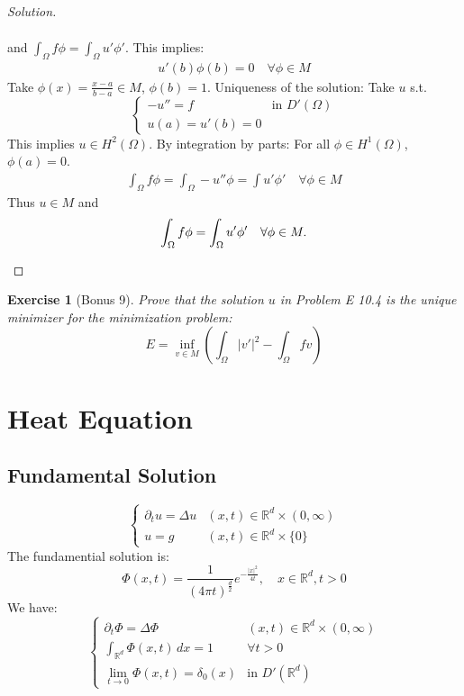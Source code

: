 \documentclass{report}
\theoremstyle{tommy}
\newtheorem{ex}[defn]{Exercise}
\begin{document}
\begin{proof}[Solution]
\begin{enumerate}[label=\alph*)]
\begin{align*}
      \end{align*}
      and \(\int_\Omega f \phi = \int_\Omega u' \phi'\). This implies:
      \begin{align*}
        u'(b) \phi(b) = 0 \quad \forall \phi \in M
      \end{align*}
      Take \(\phi(x) = \frac{x-a}{b-a} \in M\), \(\phi(b) = 1\).
      Uniqueness of the solution: Take \(u \) s.t. 
      \[\begin{cases}
        - u'' = f &\text{in } D'(\Omega) \\ u(a) = u'(b) = 0
      \end{cases}\]
      This implies \(u \in H^2(\Omega)\). By integration by parts: For all \(\phi \in H^1(\Omega)\), \(\phi(a) = 0\).
      \begin{align*}
        \int_\Omega f \phi = \int_\Omega-u''\phi = \int u' \phi' \quad \forall \phi \in M
      \end{align*}
      Thus \(u \in M\) and 
      \[\int_\Omega f \phi = \int_\Omega u' \phi' \quad \forall \phi \in M. \qedhere\]
    \end{enumerate}
  \end{proof}

  \begin{ex}[Bonus 9]
    Prove that the solution \(u\) in Problem E 10.4 is the unique minimizer for the minimization problem:
    \[E = \inf_{v \in M} \left(\int_\Omega |v'|^2 - \int_\Omega f v\right)\]
  \end{ex}

  \chapter{Heat Equation}
	\section{Fundamental Solution}
  \[
    \begin{cases}
      \partial_t u = \Delta u &(x,t) \in \mathbb{R}^d \times (0, \infty) \\
      u=g &(x,t) \in \mathbb{R}^d \times \{0\}
    \end{cases}
  \]
  The fundamential solution is:
  \[
    \Phi(x,t) = \frac{1}{(4 \pi t)^{\frac{d}{2}}} e^{-\frac{|x|^2}{4t}}, \quad x \in \mathbb{R}^d, t > 0
  \]
  We have:
  \[
    \begin{cases}
      \partial_t \Phi = \Delta \Phi &(x,t) \in \mathbb{R}^d \times (0,\infty) \\
      \int_{\mathbb{R}^d} \Phi(x,t) \, dx = 1 & \forall t > 0 \\
      \lim_{t \to 0} \Phi(x,t) = \delta_0(x) & \text{in } D'(\mathbb{R}^d)
    \end{cases}
  \]
\end{document}
